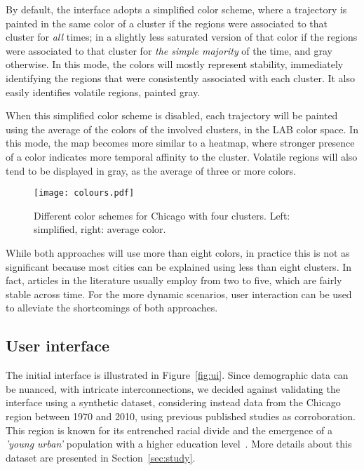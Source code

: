 By default, the interface adopts a simplified color scheme, where a trajectory
is painted in the same color of a cluster if the regions were associated to that
cluster for \emph{all} times; in a slightly less saturated version of that color
if the regions were associated to that cluster for \emph{the simple majority} of
the time, and gray otherwise. In this mode, the colors will mostly represent
stability, immediately identifying the regions that were consistently associated
with each cluster. It also easily identifies volatile regions, painted gray.


When this simplified color scheme is disabled, each trajectory will be painted
using the average of the colors of the involved clusters, in the LAB color
space. In this mode, the map becomes more similar to a heatmap, where stronger
presence of a color indicates more temporal affinity to the cluster. Volatile
regions will also tend to be displayed in gray, as the average of three or more
colors.

\begin{figure}
    \centering 
    \texttt{[image: colours.pdf]}
    \caption{Different color schemes for Chicago with four clusters. Left:
    simplified, right: average color.\label{fig:colour}}
\end{figure}

While both approaches will use more than eight colors, in practice this is not
as significant because most cities can be explained using less than eight
clusters.  In fact, articles in the literature usually employ from two to five,
which are fairly stable across time. For the more dynamic scenarios, user
interaction can be used to alleviate the shortcomings of both approaches.


\subsection{User interface}
\label{sec:ui}
The initial interface is illustrated in Figure~\ref{fig:ui}. Since demographic
data can be nuanced, with intricate interconnections, we decided against
validating the interface using a synthetic dataset, considering instead data
from the Chicago region between 1970 and 2010, using previous published studies
as corroboration. This region is known for its entrenched racial divide and the
emergence of a \emph{'young urban'} population with a higher education
level~\cite{Delmelle2016,Delmelle2017}. More details about this dataset are
presented in Section~\ref{sec:study}.

